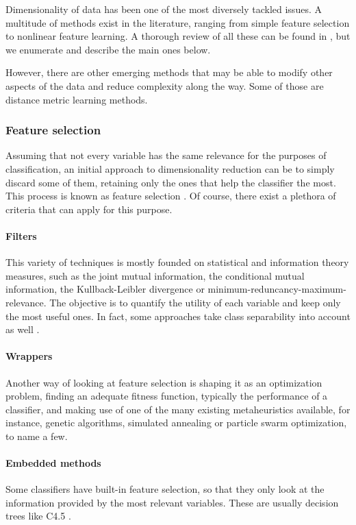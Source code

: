 Dimensionality of data has been one of the most diversely tackled issues. A multitude of methods exist in the literature, ranging from simple feature selection to nonlinear feature learning. A thorough review of all these can be found in \cite{garcia2015data}, but we enumerate and describe the main ones below.

However, there are other emerging methods that may be able to modify other aspects of the data and reduce complexity along the way. Some of those are distance metric learning methods.

\subsubsection{Feature selection}

Assuming that not every variable has the same relevance for the purposes of classification, an initial approach to dimensionality reduction can be to simply discard some of them, retaining only the ones that help the classifier the most. This process is known as feature selection \cite{garcia2015data}. Of course, there exist a plethora of criteria that can apply for this purpose.

\paragraph*{Filters} This variety of techniques is mostly founded on statistical and information theory measures, such as the joint mutual information, the conditional mutual information, the Kullback-Leibler divergence or minimum-reduncancy-maximum-relevance. The objective is to quantify the utility of each variable and keep only the most useful ones. In fact, some approaches take class separability into account as well \cite{zhang2013divergence,wang2008feature}.

\paragraph*{Wrappers} Another way of looking at feature selection is shaping it as an optimization problem, finding an adequate fitness function, typically the performance of a classifier, and making use of one of the many existing metaheuristics available, for instance, genetic algorithms, simulated annealing or particle swarm optimization, to name a few.

\paragraph*{Embedded methods} Some classifiers have built-in feature selection, so that they only look at the information provided by the most relevant variables. These are usually decision trees like C4.5 \cite{quinlan}.

